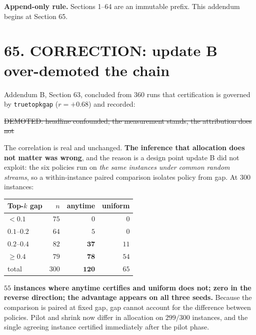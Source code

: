 \documentclass[9pt,twocolumn]{article}
\newcommand{\oldclaim}[1]{\sout{#1}}
\renewcommand{\_}{\CIGunderscore\allowbreak}
\begin{document}
\sloppy
{}

\textbf{Append-only rule.} Sections 1--64 are an immutable prefix. This addendum begins at Section 65.

\section*{65. CORRECTION: update B over-demoted the chain}
Addendum B, Section 63, concluded from $360$ runs that certification is governed by \texttt{true\_topk\_gap} ($r=+0.68$) and recorded:
\begin{center}\scriptsize\oldclaim{DEMOTED: headline confounded; the measurement stands, the attribution does not}\end{center}
The correlation is real and unchanged. \textbf{The inference that allocation does not matter was wrong}, and the reason is a design point update B did not exploit: the six policies run on \emph{the same instances under common random streams}, so a within-instance paired comparison isolates policy from gap. At $300$ instances:
\begin{center}\scriptsize
\begin{tabularx}{0.98\columnwidth}{X r r r}
\toprule
Top-$k$ gap & $n$ & anytime & uniform\\
\midrule
$<0.1$ & $75$ & $0$ & $0$\\
$0.1$--$0.2$ & $64$ & $5$ & $0$\\
$0.2$--$0.4$ & $82$ & $\mathbf{37}$ & $11$\\
$\ge0.4$ & $79$ & $\mathbf{78}$ & $54$\\
\midrule
total & $300$ & $\mathbf{120}$ & $65$\\
\bottomrule
\end{tabularx}
\end{center}
\textbf{$55$ instances where anytime certifies and uniform does not; zero in the reverse direction; the advantage appears on all three seeds.} Because the comparison is paired at fixed gap, gap cannot account for the difference between policies. Pilot and shrink now differ in allocation on $299/300$ instances, and the single agreeing instance certified immediately after the pilot phase.
\end{document}
